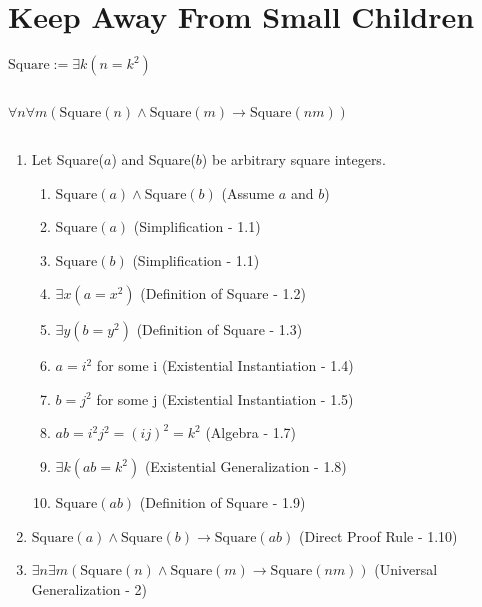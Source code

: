 \documentclass[11pt]{article}
\makeatletter
\def\imp{\rightarrow}
\newenvironment{level}%
{\addtolength{\itemindent}{2em}}%
{\addtolength{\itemindent}{-2em}}
\renewenvironment{proof}[1][\proofname]{\par
  \normalfont \topsep6\p@\@plus6\p@\relax
  \trivlist
  \item[\hskip\labelsep
        \itshape
    #1\@addpunct{.}]\ignorespaces
}{%
  \endtrivlist\@endpefalse
}
\makeatother
\begin{document}
\section{Keep Away From Small Children} %
$\text{Square} := \exists k (n = k^2)$

\subsection{} %
$\forall n \forall m (\text{Square}(n) \land \text{Square}(m) \imp \text{Square}(nm))$

\subsection{} %
\begin{proof}[\textbf{Prove $\forall n \forall m (\text{Square}(n) \land \text{Square}(m) \imp \text{Square}(nm))$}] \leavevmode
 	\begin{enumerate}
		\item Let Square($a$) and Square($b$) be arbitrary square integers.  
		\begin{enumerate}
		\begin{level}
			\item $\text{Square}(a) \land \text{Square}(b)$ \hfill (Assume $a$ and $b$)
			\item $\text{Square}(a)$ \hfill (Simplification - 1.1)
			\item $\text{Square}(b)$ \hfill (Simplification - 1.1)
			\item $\exists x (a = x^2)$ \hfill (Definition of Square - 1.2)
			\item $\exists y (b = y^2)$ \hfill (Definition of Square - 1.3)
			\item $a = i^2$ for some i \hfill (Existential Instantiation - 1.4)
			\item $b = j^2$ for some j \hfill (Existential Instantiation - 1.5)
			\item $ab = i^2 j^2 = (ij)^2 = k^2$ \hfill (Algebra - 1.7)
			\item $\exists k(ab = k^2)$	\hfill (Existential Generalization - 1.8)
			\item $\text{Square}(ab)$ \hfill (Definition of Square - 1.9) 
		\end{level}
		\end{enumerate}
		\item $\text{Square}(a) \land \text{Square}(b) \imp \text{Square}(ab)$ \hfill (Direct Proof Rule - 1.10) 
		\item $\exists n \exists m (\text{Square}(n) \land \text{Square}(m) \imp \text{Square}(nm))$ \hfill (Universal Generalization - 2)
	\end{enumerate}
\end{proof}
\end{document}
